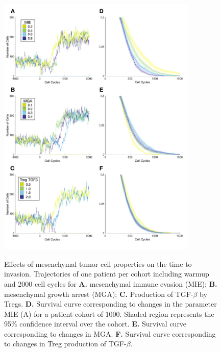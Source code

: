 \documentclass[11pt]{article}
\begin{document}
\begin{figure}
\center
{\includegraphics[width=0.85\textwidth]{Figure3/Figure3.pdf}}
\caption{Effects of mesenchymal tumor cell properties on the time to invasion. Trajectories of one patient per cohort including warmup and 2000 cell cycles for {\bf A.} mesenchymal immune evasion (MIE); {\bf B.} mesenchymal growth arrest (MGA); {\bf C.} Production of TGF-$\beta$ by Tregs.
{\bf D.} Survival curve corresponding to changes in the parameter MIE (A) for a patient cohort of 1000. Shaded region represents the 95\% confidence interval over the cohort. 
{\bf E.} Survival curve corresponding to changes in MGA.
{\bf F.} Survival curve corresponding to changes in Treg production of TGF-$\beta$. }
\label{fig:FirstSurvivalCurves}
\end{figure}
\end{document}
